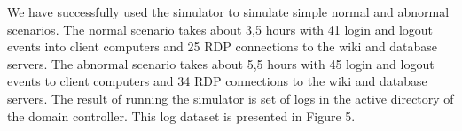  	
We have successfully used the simulator to simulate simple normal and abnormal scenarios. The normal scenario takes about 3,5 hours with 41 login and logout events into client computers and 25 RDP connections to the wiki and database servers. The abnormal scenario takes about 5,5 hours with 45 login and logout events to client computers and 34 RDP connections to the wiki and database servers. The result of running the simulator is set of logs in the active directory of the domain controller. This log dataset is presented in Figure 5. 


 
% 